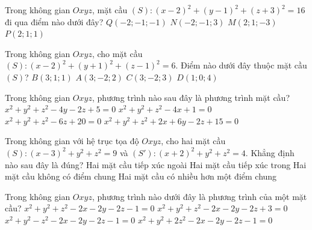 \begin{ex}%
	Trong không gian $Oxyz$, mặt cầu  $(S)\colon\left(x-2\right)^2+\left(y-1\right)^2+\left(z+3\right)^2=16$ đi qua điểm nào dưới đây?
	 \choice
		{$Q\left(-2;-1;-1\right)$} 
		{$N\left(-2;-1;3\right)$} 
		 {$M\left(2;1;-3\right)$}
		{\True $P\left(2;1;1\right)$} 
\end{ex}

\begin{ex}%
	Trong không gian $Oxyz$, cho mặt cầu $(S)\colon\left(x-2\right)^2+\left(y+1\right)^2+\left(z-1\right)^2=6$. Điểm nào dưới đây thuộc  mặt cầu $(S)$?
	 \choice
		{$B\left(3;1;1\right)$} 
		 {$A\left(3;-2;2\right)$}
		 {\True $C\left(3;-2;3\right)$}
		 {$D\left(1;0;4\right)$}
\end{ex}

\begin{ex}%
	Trong không gian  $Oxyz$, phương trình nào sau đây là phương trình mặt cầu?
	\choice 
		{$x^2+y^2+z^2-4y-2z+5=0$} 
		{\True  $x^2+y^2+z^2-4x+1=0$}
		 {$x^2+y^2+z^2-6z+20=0$}
		{$x^2+y^2+z^2+2x+6y-2z+15=0$} 
\end{ex}

\begin{ex}%
	Trong không gian với hệ trục tọa độ $Oxyz$, cho hai  mặt cầu $(S)\colon\left(x-3\right)^2+y^2+z^2=9$ và $\left(S'\right)\colon\left(x+2\right)^2+y^2+z^2=4$. Khẳng định nào sau đây là đúng?
	\choice 
		{\True Hai mặt cầu  tiếp xúc ngoài}
		 {Hai mặt cầu tiếp xúc trong}
		{Hai  mặt cầu không có điểm chung}
		{Hai mặt cầu có nhiều hơn  một điểm chung}
\end{ex}

\begin{ex}%
	Trong không  gian $Oxyz$, phương trình nào dưới đây là phương trình của một mặt cầu?
	 \choice
		{\True $x^2+y^2+z^2-2 x-2 y-2  z-1=0$}
		{$x^2+y^2+z^2-2 x-2  y-2 z+3=0$}
		{$x^2+y^2-z^2-2 x-2 y-2 z-1=0$} 
		{$x^2+y^2+2 z^2-2 x-2 y-2  z-1=0$}
\end{ex}
